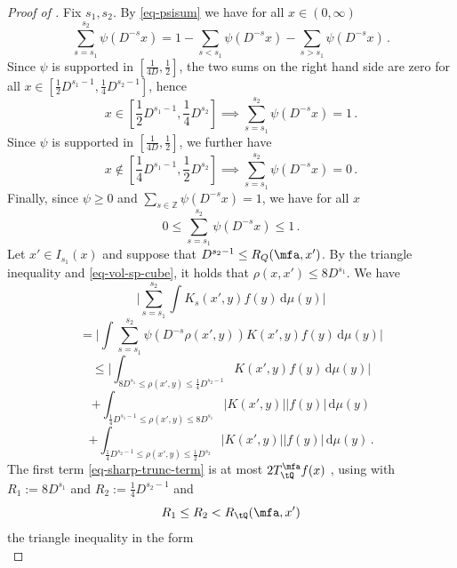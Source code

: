 \begin{proof}[Proof of ]
    Fix $s_1, s_2$. By \eqref{eq-psisum} we have for all $x \in (0, \infty)$
    $$
        \sum_{s = s_1}^{s_2} \psi(D^{-s}x) = 1 - \sum_{s < s_1} \psi(D^{-s}x) - \sum_{s > s_1} \psi(D^{-s}x)\,.
    $$
    Since $\psi$ is supported in $[\frac{1}{4D}, \frac{1}{2}]$, the two sums on the right hand side are zero for all $x \in [\frac{1}{2}D^{s_1-1}, \frac{1}{4} D^{s_2 - 1}]$, hence
    $$
        x \in [\frac{1}{2}D^{s_1-1}, \frac{1}{4} D^{s_2}] \implies \sum_{s = s_1}^{s_2} \psi(D^{-s}x) = 1\,.
    $$
    Since $\psi$ is supported in $[\frac{1}{4D}, \frac{1}{2}]$, we further have
    $$
        x \notin [\frac{1}{4}D^{s_1 - 1}, \frac{1}{2}D^{s_2}] \implies \sum_{s = s_1}^{s_2} \psi(D^{-s}x) = 0\,.
    $$
    Finally, since $\psi \ge 0$ and $\sum_{s \in \mathbb{Z}} \psi(D^{-s}x) = 1$, we have for all $x$
    $$
        0 \le \sum_{s = s_1}^{s_2} \psi(D^{-s}x) \le 1\,.
    $$
    Let $x' \in I_{s_1}(x)$ and suppose that $D^{s_2 - 1} \le R_Q(\mfa, x')$. By the triangle inequality and \eqref{eq-vol-sp-cube}, it holds that $\rho(x,x') \le 8D^{s_1}$. We have
    $$
        \Bigg|\sum_{s = s_1}^{s_2} \int K_s(x',y) f(y) \, \mathrm{d}\mu(y)\Bigg|
    $$
    $$
        = \Bigg|\int \sum_{s = s_1}^{s_2} \psi(D^{-s}\rho(x',y)) K(x',y) f(y) \, \mathrm{d}\mu(y)\Bigg|
    $$
    \begin{equation}
        \label{eq-sharp-trunc-term}
        \le \Bigg| \int_{8D^{s_1} \le \rho(x',y) \le \frac{1}{4}D^{s_2-1}} K(x',y) f(y) \, \mathrm{d}\mu(y) \Bigg|
    \end{equation}
    \begin{equation}
        \label{eq-lower-bound-term}
        + \int_{\frac{1}{4}D^{s_1-1} \le \rho(x',y) \le 8D^{s_1}} |K(x', y)| |f(y)| \, \mathrm{d}\mu(y)
    \end{equation}
    \begin{equation}
        \label{eq-upper-bound-term}
        + \int_{\frac{1}{4}D^{s_2-1} \le \rho(x',y) \le \frac{1}{2}D^{s_2}} |K(x', y)| |f(y)| \, \mathrm{d}\mu(y)\,.
    \end{equation}
    The first term \eqref{eq-sharp-trunc-term} is at most
     $2T_{\tQ}^\mfa f(x)$ ,
    using with $R_1:=8D^{s_1}$ and
    $R_2:=\frac{1}{4}D^{s_2-1}$
    and
    \begin{equation}
        R_1 \le  R_2<R_{\tQ}(\mfa,x')
    \end{equation}
    the triangle inequality in the form
    \begin{equation}

\end{equation}
\end{proof}

